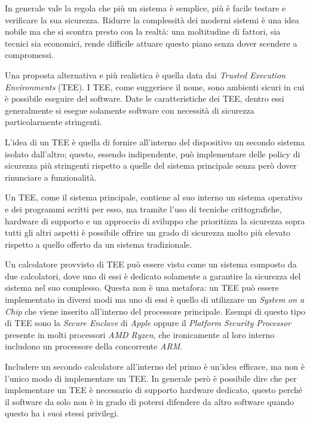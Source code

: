 \documentclass[12pt,italian]{report}
\begin{document}
In generale vale la regola che più un sistema è semplice, più è facile testare
e verificare la sua sicurezza.
Ridurre la complessità dei moderni sistemi è una idea nobile ma che si scontra
presto con la realtà: una moltitudine di fattori, sia tecnici sia economici,
rende difficile attuare questo piano senza dover scendere a compromessi.

\bigbreak \noindent

Una proposta alternativa e più realistica è quella data dai
\textit{Trusted Execution Environments} (TEE).
I TEE, come suggerisce il nome, sono ambienti sicuri in cui è possibile
eseguire del software. Date le caratteristiche dei TEE, dentro essi
generalmente si esegue solamente software con necessità di sicurezza
particolarmente stringenti.

L'idea di un TEE è quella di fornire all'interno del dispositivo
un secondo sistema isolato dall'altro; questo, essendo
indipendente, può implementare delle policy di sicurezza più
stringenti rispetto a quelle del sistema principale senza però dover
rinunciare a funzionalità.

Un TEE, come il sistema principale, contiene al suo interno un sistema
operativo e dei programmi scritti per esso, ma tramite l'uso di tecniche
crittografiche, hardware di supporto e un approccio di sviluppo che
prioritizza la sicurezza sopra tutti gli altri aspetti è possibile
offrire un grado di sicurezza molto più elevato rispetto a quello
offerto da un sistema tradizionale.

\bigbreak \noindent

Un calcolatore provvisto di TEE può essere visto come un sistema composto da
due calcolatori, dove uno di essi è dedicato solamente a garantire la sicurezza
del sistema nel suo complesso.
Questa non è una metafora: un TEE può essere implementato in diversi modi ma
uno di essi è quello di utilizzare un \textit{System on a Chip} che viene
inserito all'interno del processore principale.
Esempi di questo tipo di TEE sono la \textit{Secure Enclave}
di \textit{Apple} oppure il \textit{Platform Security Processor} presente
in molti processori \textit{AMD Ryzen}, che ironicamente al loro interno
includono un processore della concorrente \textit{ARM}.

Includere un secondo calcolatore all'interno del primo è un'idea efficace,
ma non è l'unico modo di implementare un TEE.
In generale però è possibile dire che per implementare un TEE è necessario
di supporto hardware dedicato, questo perché il software da solo non è in
grado di potersi difendere da altro software quando questo ha i suoi
stessi privilegi.
\end{document}
